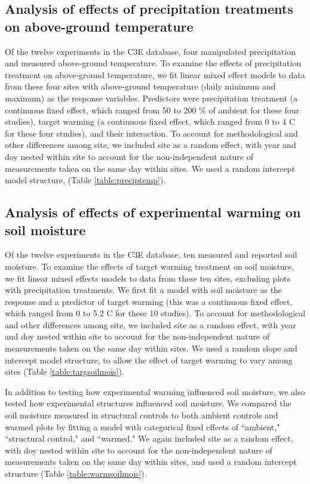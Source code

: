 \documentclass{article}
\begin{document}
\subsection* {Analysis of effects of precipitation treatments on above-ground temperature}
Of the twelve experiments in the C3E database, four manipulated precipitation and measured above-ground temperature. To examine the effects of precipitation treatment on above-ground temperature, we fit linear mixed effect models to data from these four sites with above-ground temperature (daily minimum and maximum) as the response variables. Predictors were precipitation treatment (a continuous fixed effect, which ranged from 50 to 200 \% of ambient for these four studies), target warming (a continuous fixed effect, which ranged from 0 to 4 \degree C for these four studies), and their interaction. To account for methodological and other differences among site, we included site as a random effect, with year and doy nested within site to account for the non-independent nature of measurements taken on the same day within sites. We used a random intercept model structure, (Table \ref{table:preciptemp}). 
\subsection* {Analysis of effects of experimental warming on soil moisture}
Of the twelve experiments in the C3E database, ten measured and reported soil moisture. To examine the effects of target warming treatment on soil moisture, we fit linear mixed effects models to data from these ten sites, excluding plots with precipitation treatments. We first fit a model with soil moisture as the response and a predictor of target warming (this was a continuous fixed effect, which ranged from 0 to 5.2 \degree C for these 10 studies). To account for methodological and other differences among site, we included site as a random effect, with year and doy nested within site to account for the non-independent nature of measurements taken on the same day within sites.  We used a random slope and intercept model structure, to allow the effect of target warming to vary among sites (Table \ref{table:targsoilmois}). 
\par In addition to testing how experimental warming influenced soil moisture, we also tested how experimental structures influenced soil moisture. We compared the soil moisture measured in structural controls to both ambient controls and warmed plots by fitting a model with categorical fixed effects of ``ambient," ``structural control," and ``warmed."  We again included site as a random effect, with doy nested within site to account for the non-independent nature of measurements taken on the same day within sites, and used a random intercept structure (Table \ref{table:warmsoilmois}). 
\end{document}
